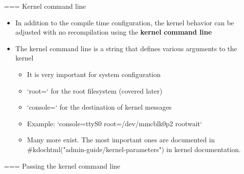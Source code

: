 === Kernel command line
  \begin{itemize}
  \item In addition to the compile time configuration, the kernel
    behavior can be adjusted with no recompilation using the {\bf
      kernel command line}
  \item The kernel command line is a string that defines various
    arguments to the kernel
    \begin{itemize}
    \item It is very important for system configuration
    \item `root=` for the root filesystem (covered later)
    \item `console=` for the destination of kernel messages
    \item Example: `console=ttyS0 root=/dev/mmcblk0p2 rootwait`
    \item Many more exist. The most important ones are documented
          in #kdochtml("admin-guide/kernel-parameters") in kernel
          documentation.
    \end{itemize}
  \end{itemize}


=== Passing the kernel command line
  
